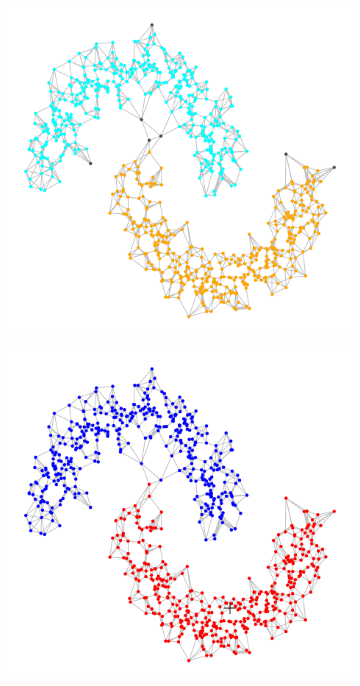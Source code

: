 \documentclass{article}
\newcommand{\1}{\mathbf{1}}
\theoremstyle{aldenthm}
\theoremstyle{aldenrmrk}
\begin{document}
\begin{figure}
	\centering
	\begin{adjustbox}{minipage=\linewidth,scale=0.8}
	\begin{subfigure}{.24\linewidth}
		\includegraphics[width=\linewidth,scale = .5]{example2plots/row1_true_density_cluster}
		\caption{}
	\end{subfigure}
	\begin{subfigure}{.24\linewidth}
		\includegraphics[width=\linewidth]{example2plots/row1_ppr_cluster}

\end{subfigure}
\end{adjustbox}
\end{figure}
\end{document}
